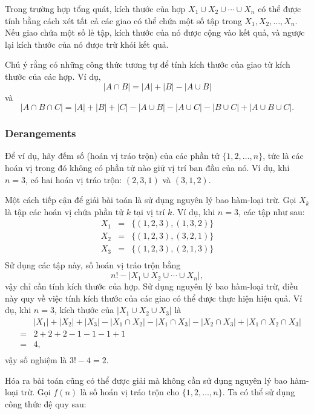 Trong trường hợp tổng quát, kích thước của 
hợp $X_1 \cup X_2 \cup \cdots \cup X_n$
có thể được tính bằng cách xét tất cả các
giao có thể chứa một số tập trong $X_1,X_2,\ldots,X_n$.
Nếu giao chứa một số lẻ tập,
kích thước của nó được cộng vào kết quả,
và ngược lại kích thước của nó được trừ khỏi kết quả.

Chú ý rằng có những công thức tương tự
để tính
kích thước của giao từ kích thước của
các hợp. Ví dụ,
\[ |A \cap B| = |A| + |B| - |A \cup B|\]
và
\[ |A \cap B \cap C| = |A| + |B| + |C| - |A \cup B|  - |A \cup C|  - |B \cup C| + |A \cup B \cup C| .\]

\subsubsection{Derangements}


Để ví dụ, hãy đếm số  (hoán vị tráo trộn)
của các phần tử $\{1,2,\ldots,n\}$, tức là các hoán vị
trong đó không có phần tử nào giữ vị trí ban đầu của nó.
Ví dụ, khi $n=3$, có
hai hoán vị tráo trộn: $(2,3,1)$ và $(3,1,2)$.

Một cách tiếp cận để giải bài toán là sử dụng
nguyên lý bao hàm-loại trừ.
Gọi $X_k$ là tập các hoán vị
chứa phần tử $k$ tại vị trí $k$.
Ví dụ, khi $n=3$, các tập như sau:
\[
\begin{array}{lcl}
X_1 & = & \{(1,2,3),(1,3,2)\} \\
X_2 & = & \{(1,2,3),(3,2,1)\} \\
X_3 & = & \{(1,2,3),(2,1,3)\} \\
\end{array}
\]
Sử dụng các tập này, số hoán vị tráo trộn bằng
\[ n! - |X_1 \cup X_2 \cup \cdots \cup X_n|, \]
vậy chỉ cần tính kích thước của hợp.
Sử dụng nguyên lý bao hàm-loại trừ, điều này quy về
việc tính kích thước của các giao có thể được
thực hiện hiệu quả.
Ví dụ, khi $n=3$, kích thước của
$|X_1 \cup X_2 \cup X_3|$ là
\[
\begin{array}{lcl}
 & & |X_1| + |X_2| + |X_3| - |X_1 \cap X_2|  - |X_1 \cap X_3|  - |X_2 \cap X_3| + |X_1 \cap X_2 \cap X_3| \\
 & = & 2+2+2-1-1-1+1 \\
 & = & 4, \\
\end{array}
\]
vậy số nghiệm là $3!-4=2$.

Hóa ra bài toán cũng có thể được giải
mà không cần sử dụng nguyên lý bao hàm-loại trừ.
Gọi $f(n)$ là số hoán vị tráo trộn
cho $\{1,2,\ldots,n\}$. Ta có thể sử dụng
công thức đệ quy sau:

